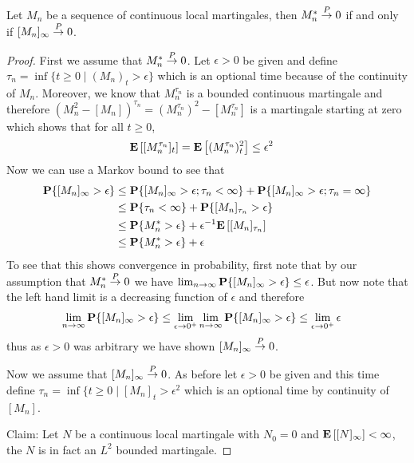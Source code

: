\begin{lem}\label{QuadraticCovariationAndContinuity}Let $M_n$ be a sequence of continuous local martingales, then $M_n^* \overset{P}\to 0$ if and only if $[M_n]_\infty \overset{P}\to 0$.
\end{lem}
\begin{proof}
First we assume that $M_n^* \overset{P}\to 0$.  Let $\epsilon > 0$ be given and define $\tau_n = \inf \lbrace t \geq 0 \mid (M_n)_t > \epsilon \rbrace$ which is an optional time because of the continuity of $M_n$.  Moreover, we know that $M^{\tau_n}_n$ is a bounded continuous martingale and therefore $(M^2_n - [M_n])^{\tau_n} = (M^{\tau_n}_n)^2 - [M^{\tau_n}_n]$ is a martingale starting at zero which shows that for all $t \geq 0$,
\begin{align*}
\textbf{E}\left[[M^{\tau_n}_n]_t\right] &=  \textbf{E}\left[(M^{\tau_n}_n)_t^2\right] \leq \epsilon^2
\end{align*}
Now we can use a Markov bound to see that
\begin{align*}
\textbf{P}\{[M_n]_\infty > \epsilon\} &\leq \textbf{P}\{[M_n]_\infty > \epsilon; \tau_n < \infty \} + \textbf{P}\{[M_n]_\infty > \epsilon; \tau_n = \infty \} \\
&\leq \textbf{P}\{ \tau_n < \infty \} + \textbf{P}\{[M_n]_{\tau_n} > \epsilon\} \\
&\leq \textbf{P}\{ M^*_n > \epsilon \} + \epsilon^{-1} \textbf{E}\left[[M_n]_{\tau_n}\right] \\
&\leq \textbf{P}\{ M^*_n > \epsilon \} + \epsilon
\end{align*}
To see that this shows convergence in probability, first note that by our assumption that $M^*_n \overset{P}\to 0$ we have $\lim_{n \to \infty} \textbf{P}\{[M_n]_\infty > \epsilon\} \leq \epsilon$.  But now note that the left hand limit is a decreasing function of $\epsilon$ and therefore 
\begin{align*}
\lim_{n \to \infty} \textbf{P}\{[M_n]_\infty > \epsilon\} &\leq \lim_{\epsilon \to 0^+} \lim_{n \to \infty} \textbf{P}\{[M_n]_\infty > \epsilon\} \leq \lim_{\epsilon \to 0^+} \epsilon
\end{align*}
thus as $\epsilon > 0$ was arbitrary we have shown $[M_n]_\infty \overset{P}\to 0$.

Now we assume that $[M_n]_\infty \overset{P}\to 0$.  As before let $\epsilon > 0$ be given and this time define $\tau_n = \inf \lbrace t \geq 0 \mid [M_n]_t > \epsilon^2$ which is an optional time by continuity of $[M_n]$.  

Claim: Let $N$ be a continuous local martingale with $N_0 = 0$ and $\textbf{E}\left[[N]_\infty\right] < \infty$, the $N$ is in fact an $L^2$ bounded martingale.


\end{proof}
